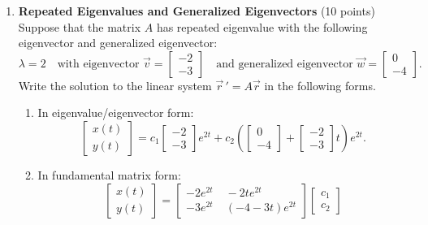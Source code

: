 \begin{enumerate}
  \item \textbf{Repeated Eigenvalues and Generalized Eigenvectors} (10 points)\\
  Suppose that the matrix $A$ has repeated eigenvalue with the following eigenvector and generalized eigenvector:  
  \[
  \lambda = 2 \quad \text{with eigenvector } \vec{v} = 
  \begin{bmatrix}
  -2 \\ -3
  \end{bmatrix}
  \quad \text{and generalized eigenvector } 
  \vec{w} =
  \begin{bmatrix}
  0 \\ -4
  \end{bmatrix}.
  \]
  Write the solution to the linear system $\vec{r}\,' = A \vec{r}$ in the following forms.
  \begin{enumerate}[label=\textbf{\Alph*.}]
    \item In eigenvalue/eigenvector form:\\
    \[
    \begin{bmatrix}
    x(t) \\ y(t)
    \end{bmatrix}
    =
    c_{1}
    \begin{bmatrix}
    -2 \\ -3
    \end{bmatrix} e^{2t}
    +
    c_{2}\left(
    \begin{bmatrix}
    0 \\ -4
    \end{bmatrix}
    +
    \begin{bmatrix}
    -2 \\ -3
    \end{bmatrix} t
    \right) e^{2t}.
    \]
    \begin{subanswer}
    \end{subanswer}
    \item In fundamental matrix form:\\
    \[
    \begin{bmatrix}
    x(t) \\ y(t)
    \end{bmatrix}
    =
    \begin{bmatrix}
    -2e^{2t} & \; -2t e^{2t} \\[6pt]
    -3e^{2t} & \; (-4 - 3t)e^{2t}
    \end{bmatrix}
    \begin{bmatrix}
    c_{1} \\ c_{2}

\end{bmatrix}\]
\end{enumerate}
\end{enumerate}
